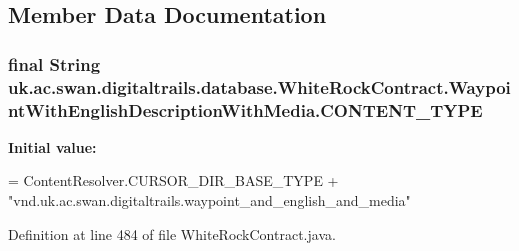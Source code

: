 \subsection{Member Data Documentation}
\hypertarget{classuk_1_1ac_1_1swan_1_1digitaltrails_1_1database_1_1_white_rock_contract_1_1_waypoint_with_english_description_with_media_a42b173cb35f7a42233dde2e566b70c2b}{
\subsubsection[{C\+O\+N\+T\+E\+N\+T\+\_\+\+T\+Y\+P\+E}]{\setlength{\rightskip}{0pt plus 5cm}final String uk.\+ac.\+swan.\+digitaltrails.\+database.\+White\+Rock\+Contract.\+Waypoint\+With\+English\+Description\+With\+Media.\+C\+O\+N\+T\+E\+N\+T\+\_\+\+T\+Y\+P\+E\hspace{0.3cm}{\ttfamily [static]}}}\label{classuk_1_1ac_1_1swan_1_1digitaltrails_1_1database_1_1_white_rock_contract_1_1_waypoint_with_english_description_with_media_a42b173cb35f7a42233dde2e566b70c2b}
{\bfseries Initial value\+:}
\begin{DoxyCode}
= ContentResolver.CURSOR\_DIR\_BASE\_TYPE +
                \textcolor{stringliteral}{"vnd.uk.ac.swan.digitaltrails.waypoint\_and\_english\_and\_media"}
\end{DoxyCode}


Definition at line 484 of file White\+Rock\+Contract.\+java.

